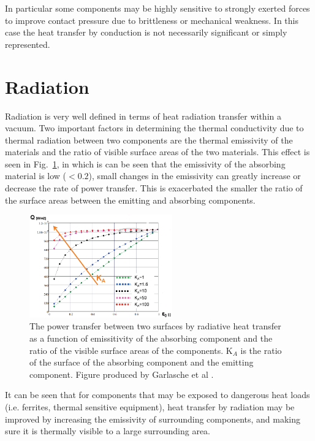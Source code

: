 In particular some components may be highly sensitive to strongly exerted forces to improve contact pressure due to brittleness or mechanical weakness. In this case the heat transfer by conduction is not necessarily significant or simply represented.

\section{Radiation}

Radiation is very well defined in terms of heat radiation transfer within a vacuum. Two important factors in determining the thermal conductivity due to thermal radiation between two components are the thermal emissivity of the materials and the ratio of visible surface areas of the two materials. This effect is seen in Fig.~\ref{fig:powTransRadSurfEmis}, in which is can be seen that the emissivity of the absorbing material is low ($< 0.2$), small changes in the emissivity can greatly increase or decrease the rate of power transfer. This is exacerbated the smaller the ratio of the surface areas between the emitting and absorbing components.

\begin{figure}
\begin{center}
\includegraphics[width=0.55\textwidth]{appendices/figures/powTransRadSurEmis.png}
\end{center}
\caption{The power transfer between two surfaces by radiative heat transfer as a function of emissitivity of the absorbing component and the ratio of the visible surface areas of the components. K$_{A}$ is the ratio of the surface of the absorbing component and the emitting component. Figure produced by Garlasche et al \cite{Garlasche:heatTransfer}.}
\label{fig:powTransRadSurfEmis}
\end{figure}

It can be seen that for components that may be exposed to dangerous heat loads (i.e. ferrites, thermal sensitive equipment), heat transfer by radiation may be improved by increasing the emissivity of surrounding components, and making sure it is thermally visible to a large surrounding area.


